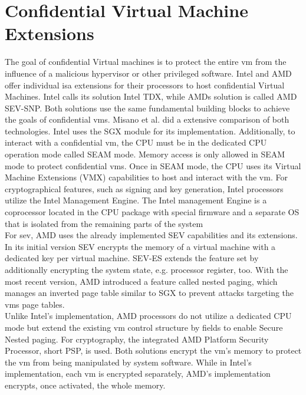 \section{Confidential Virtual Machine Extensions}
\label{section:20:confidential_vms}
The goal of confidential Virtual machines is to protect the entire \gls{vm} from
the influence of a malicious hypervisor or other privileged software. Intel and
AMD offer individual \gls{isa} extensions for their processors to host
confidential Virtual Machines. Intel calls its solution Intel TDX, while AMDs
solution is called AMD SEV-SNP.\cite{tdx_whitepaper,kaplan_amd_2020} Both
solutions use the same fundamental building blocks to achieve the goals of
confidential \gls{vm}s. Misano et al. did a extensive comparison of both
technologies.\cite{misono_confidential_2024} Intel uses the SGX module for its
implementation. Additionally, to interact with a confidential \gls{vm}, the CPU
must be in the dedicated CPU operation mode called SEAM mode. Memory access is
only allowed in SEAM mode to protect confidential \gls{vm}s. Once in SEAM mode,
the CPU uses its Virtual Machine Extensions (VMX) capabilities to host and
interact with the \gls{vm}. For cryptographical features, such as signing and
key generation, Intel processors utilize the Intel Management Engine. The Intel
management Engine is a coprocessor located in the CPU package with special
firmware and a separate OS that is isolated from the remaining parts of the
system\\

For \gls{sev}, AMD uses the already implemented SEV capabilities and its
extensions. In its initial version SEV encrypts the memory of a virtual machine
with a dedicated key per virtual machine. SEV-ES extends the feature set by
additionally encrypting the system state, e.g. processor register, too. With the
most recent version, AMD introduced a feature called nested paging, which
manages an inverted page table similar to SGX to prevent attacks targeting the
\gls{vm}s page tables.\\

Unlike Intel's implementation, AMD processors do not utilize a dedicated CPU
mode but extend the existing \gls{vm} control structure by fields to enable
Secure Nested paging. For cryptography, the integrated AMD Platform Security
Processor, short PSP, is used. Both solutions encrypt the \gls{vm}'s memory to
protect the \gls{vm} from being manipulated by system software. While in Intel's
implementation, each \gls{vm} is encrypted separately, AMD's implementation
encrypts, once activated, the whole memory.\\

